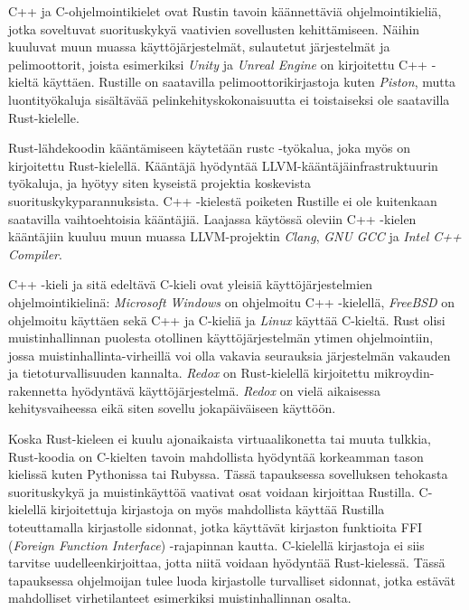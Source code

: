 \documentclass[finnish]{tktltiki2}
\theoremstyle{definition}
\theoremstyle{remark}
\begin{document}
C++ ja C-ohjelmointikielet ovat Rustin tavoin käännettäviä ohjelmointikieliä, jotka soveltuvat suorituskykyä vaativien sovellusten kehittämiseen. Näihin kuuluvat muun muassa käyttöjärjestelmät, sulautetut järjestelmät ja pelimoottorit, joista esimerkiksi \textit{Unity} ja \textit{Unreal Engine} on kirjoitettu C++ -kieltä käyttäen. Rustille on saatavilla pelimoottorikirjastoja kuten \textit{Piston}, mutta luontityökaluja sisältävää pelinkehityskokonaisuutta ei toistaiseksi ole saatavilla Rust-kielelle.\cite{AreWeGameYet}

Rust-lähdekoodin kääntämiseen käytetään rustc -työkalua, joka myös on kirjoitettu Rust-kielellä. Kääntäjä hyödyntää LLVM-kääntäjäinfrastruktuurin työkaluja, ja hyötyy siten kyseistä projektia koskevista suorituskykyparannuksista.\cite{HowFastIsRust} C++ -kielestä poiketen Rustille ei ole kuitenkaan saatavilla vaihtoehtoisia kääntäjiä. Laajassa käytössä oleviin C++ -kielen kääntäjiin kuuluu muun muassa LLVM-projektin \textit{Clang}, \textit{GNU GCC} ja \textit{Intel C++ Compiler}.

C++ -kieli ja sitä edeltävä C-kieli ovat yleisiä käyttöjärjestelmien ohjelmointikielinä: \textit{Microsoft Windows} on ohjelmoitu C++ -kielellä, \textit{FreeBSD} on ohjelmoitu käyttäen sekä C++ ja C-kieliä ja \textit{Linux} käyttää C-kieltä. Rust olisi muistinhallinnan puolesta otollinen käyttöjärjestelmän ytimen ohjelmointiin, jossa muistinhallinta-virheillä voi olla vakavia seurauksia järjestelmän vakauden ja tietoturvallisuuden kannalta. \textit{Redox} on Rust-kielellä kirjoitettu mikroydin-rakennetta hyödyntävä käyttöjärjestelmä.\cite{WhatRedoxIs} \textit{Redox} on vielä aikaisessa kehitysvaiheessa eikä siten sovellu jokapäiväiseen käyttöön.

Koska Rust-kieleen ei kuulu ajonaikaista virtuaalikonetta tai muuta tulkkia, Rust-koodia on C-kielten tavoin mahdollista hyödyntää korkeamman tason kielissä kuten Pythonissa tai Rubyssa. Tässä tapauksessa sovelluksen tehokasta suorituskykyä ja muistinkäyttöä vaativat osat voidaan kirjoittaa Rustilla.\cite{RustInsideOtherLanguages} C-kielellä kirjoitettuja kirjastoja on myös mahdollista käyttää Rustilla toteuttamalla kirjastolle sidonnat, jotka käyttävät kirjaston funktioita FFI (\textit{Foreign Function Interface}) -rajapinnan kautta. C-kielellä kirjastoja ei siis tarvitse uudelleenkirjoittaa, jotta niitä voidaan hyödyntää Rust-kielessä. Tässä tapauksessa ohjelmoijan tulee luoda kirjastolle turvalliset sidonnat, jotka estävät mahdolliset virhetilanteet esimerkiksi muistinhallinnan osalta.
\end{document}
